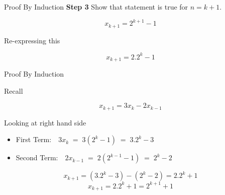\documentclass[12pt]{article}
\begin{document}
{Proof By Induction}
\textbf{Step 3} Show that statement is true for $n=k+1$.

\[ x_{k+1} = 2^{k+1} - 1 \]

Re-expressing this

\[ x_{k+1} = 2.2^{k} - 1 \]


{Proof By Induction}

Recall
 
\[ x_{k+1} = 3x_{k} - 2x_{k-1} \]


Looking at right hand side 
\begin{itemize}
\item First Term: $\mbox{       }  3x_{k}\; = \;3(2^{k} - 1) \;=\; 3.2^{k} - 3$
\item Second Term: $ \mbox{       }2x_{k-1} \;= \;2(2^{k-1} - 1) \;= \;2^{k} - 2$
\end{itemize}

\[ x_{k+1} = (3.2^{k} - 3) - (2^{k} - 2) = 2.2^{k} + 1 \]
\[ x_{k+1} = 2.2^{k} + 1 = 2^{k+1} + 1 \]

 
\end{document}
